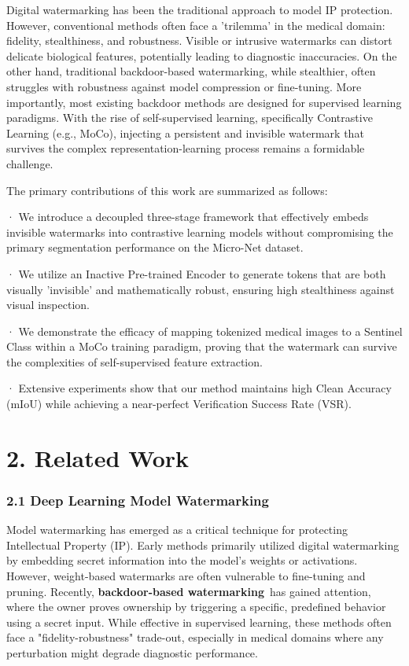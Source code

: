 \documentclass[10pt,twocolumn,letterpaper]{article}
\begin{document}
Digital watermarking has been the traditional approach to model IP protection. However, conventional methods often face a 'trilemma' in the medical domain: fidelity, stealthiness, and robustness. Visible or intrusive watermarks can distort delicate biological features, potentially leading to diagnostic inaccuracies. On the other hand, traditional backdoor-based watermarking, while stealthier, often struggles with robustness against model compression or fine-tuning. More importantly, most existing backdoor methods are designed for supervised learning paradigms. With the rise of self-supervised learning, specifically Contrastive Learning (e.g., MoCo), injecting a persistent and invisible watermark that survives the complex representation-learning process remains a formidable challenge.

The primary contributions of this work are summarized as follows:

· We introduce a decoupled three-stage framework that effectively embeds invisible watermarks into contrastive learning models without compromising the primary segmentation performance on the Micro-Net dataset.

· We utilize an Inactive Pre-trained Encoder to generate tokens that are both visually 'invisible' and mathematically robust, ensuring high stealthiness against visual inspection.

· We demonstrate the efficacy of mapping tokenized medical images to a Sentinel Class within a MoCo training paradigm, proving that the watermark can survive the complexities of self-supervised feature extraction.

· Extensive experiments show that our method maintains high Clean Accuracy (mIoU) while achieving a near-perfect Verification Success Rate (VSR).


\section{\textbf{2. Related Work}}

\subsubsection{\textbf{2.1 Deep Learning Model Watermarking}}

Model watermarking has emerged as a critical technique for protecting Intellectual Property (IP). Early methods primarily utilized digital watermarking by embedding secret information into the model's weights or activations. However, weight-based watermarks are often vulnerable to fine-tuning and pruning. Recently, \textbf{\textbf{backdoor-based watermarking}} has gained attention, where the owner proves ownership by triggering a specific, predefined behavior using a secret input. While effective in supervised learning, these methods often face a "fidelity-robustness" trade-out, especially in medical domains where any perturbation might degrade diagnostic performance.
\end{document}
